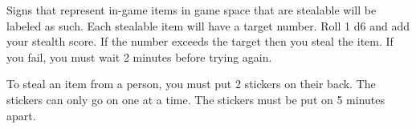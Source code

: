 \documentclass[green]{LRSguildcamp1}
\begin{document}
\name{\gStealing{}}

Signs that represent in-game items in game space that are stealable will be labeled as such. Each stealable item will have a target number. Roll 1 d6 and add your stealth score.  If the number exceeds the target then you steal the item. If you fail, you must wait 2 minutes before trying again.

To steal an item from a person, you must put 2 stickers on their back. The stickers can only go on one at a time. The stickers must be put on 5 minutes apart.
\end{document}
